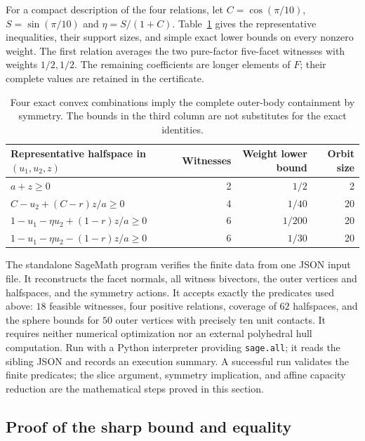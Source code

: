 For a compact description of the four relations, let
$C=\cos(\pi/10)$, $S=\sin(\pi/10)$ and $\eta=S/(1+C)$.
Table~\ref{tab:affine-four-relations} gives the representative inequalities,
their support sizes, and simple exact lower bounds on every nonzero weight.
The first relation averages the two pure-factor five-facet witnesses with
weights $1/2,1/2$. The remaining coefficients are longer elements of $F$;
their complete values are retained in the certificate.

\begin{table}[ht]
\centering
\small
\begin{tabular}{@{}lrrr@{}}
\toprule
Representative halfspace in $(u_1,u_2,z)$
 & Witnesses & Weight lower bound & Orbit size\\
\midrule
$a+z\geq0$ & 2 & $1/2$ & 2\\
$C-u_2+(C-r)z/a\geq0$ & 4 & $1/40$ & 20\\
$1-u_1-\eta u_2+(1-r)z/a\geq0$ & 6 & $1/200$ & 20\\
$1-u_1-\eta u_2-(1-r)z/a\geq0$ & 6 & $1/30$ & 20\\
\bottomrule
\end{tabular}
\caption{Four exact convex combinations imply the complete outer-body
containment by symmetry. The bounds in the third column are not substitutes
for the exact identities.}
\label{tab:affine-four-relations}
\end{table}

The standalone SageMath program verifies the finite data from one JSON
input file. It reconstructs the facet normals,
all witness bivectors, the outer vertices and halfspaces, and the symmetry
actions. It accepts exactly the predicates used above: $18$ feasible
witnesses, four positive relations, coverage of $62$ halfspaces, and the
sphere bounds for $50$ outer vertices with precisely ten unit contacts.
It requires neither numerical optimization nor an external polyhedral
hull computation. Run  with a
Python interpreter providing \texttt{sage.all}; it reads the sibling JSON
and records an execution summary. A successful run validates the
finite predicates; the slice argument, symmetry implication, and affine
capacity reduction are the mathematical steps proved in this section.

\subsection{Proof of the sharp bound and equality}

